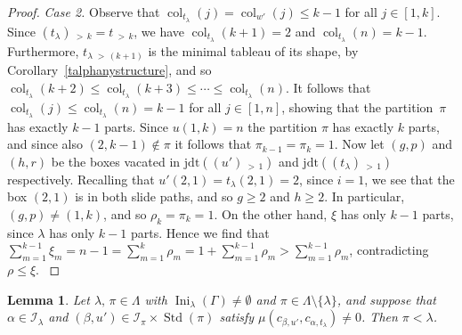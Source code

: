 \documentclass[10pt]{amsart}
\newtheorem{lemm}[theo]{Lemma}
\theoremstyle{definition}
\newenvironment{Case}[1]{\smallskip\noindent\emph{Case #1}\endgraf
 \nobreak\noindent\ignorespaces}{\endgraf\smallskip}
\DeclareMathOperator{\Ini}{Ini}
\DeclareMathOperator{\col}{col}
\newcommand{\morethan}[2]{#1\,{_{>\,#2}}}
\newcommand{\jdt}{\mathrm{jdt}}
\DeclareMathOperator{\STD}{Std}
\begin{document}
\begin{proof}
\begin{Case}{2. }
Observe that $\col_{t_\lambda}(j)=\col_{w'}(j)\leqslant k-1$ for all $j\in[1,k]$. Since
$\morethan {(t_\lambda)}k=\morethan tk$, we have $\col_{t_\lambda}(k+1)=2$ and
$\col_{t_\lambda}(n)=k-1$. Furthermore, $\morethan{t_\lambda}{(k+1)}$ is the minimal
tableau of its shape, by Corollary~\ref{talphanystructure}, and so
$\col_{t_\lambda}(k+2)\leqslant\col_{t_\lambda}(k+3)\leqslant\cdots\leqslant\col_{t_\lambda}(n)$.
It follows that $\col_{t_\lambda}(j)\leqslant\col_{t_\lambda}(n)=k-1$ for all $j\in[1,n]$,
showing that the partition~$\pi$ has exactly $k-1$ parts.
Since $u(1,k)=n$ the partition $\pi$ has exactly $k$ parts, and since also $(2,k-1)\notin\pi$
it follows that $\pi_{k-1}=\pi_k=1$. Now let $(g,p)$ and $(h,r)$ be the boxes vacated in
$\jdt(\morethan{(u')}{1})$ and $\jdt(\morethan{(t_\lambda)}{1})$ respectively. Recalling that
$u'(2,1)=t_\lambda(2,1)=2$, since $i=1$, we see that the box $(2,1)$ is in both slide paths,
and so $g\geqslant 2$ and $h\geqslant 2$. In particular, $(g,p)\ne(1,k)$, and so
$\rho_k=\pi_k=1$. On the other hand, $\xi$ has only $k-1$ parts, since $\lambda$ has
only $k-1$ parts. Hence we find that
$\sum_{m=1}^{k-1}\xi_m=n-1=\sum_{m=1}^{k}\rho_m=1+\sum_{m=1}^{k-1}\rho_m>\sum_{m=1}^{k-1}\rho_m$,
contradicting $\rho\leqslant\xi$.\qedhere
\end{Case}
\end{proof}

\begin{lemm}\label{kminimimalcompared}
Let $\lambda,\,\pi\in\Lambda$ with $\Ini_\lambda(\Gamma)\ne\emptyset$ and
$\pi\in\Lambda\setminus\{\lambda\}$, and suppose that $\alpha\in\mathcal I_\lambda$
and $(\beta,u')\in\mathcal I_\pi\times\STD(\pi)$ satisfy
$\mu(c_{\beta,u'},c_{\alpha,t_\lambda})\neq 0$.
Then $\pi<\lambda$.
\end{lemm}
\end{document}
